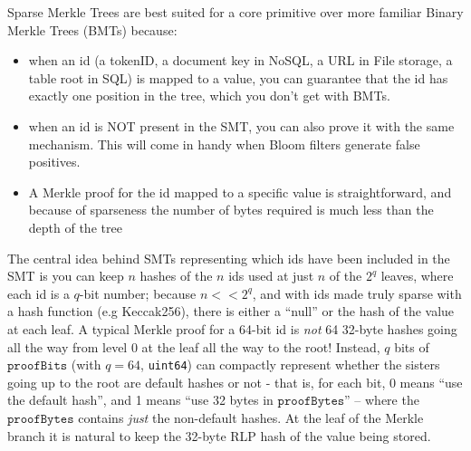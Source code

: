 \documentclass{article}
\newcommand{\proofBits}{\texttt{proofBits}}
\newcommand{\proofBytes}{\texttt{proofBytes}}
\begin{document}
Sparse Merkle Trees are best suited for a core primitive over more familiar Binary Merkle Trees (BMTs) because:
\begin{itemize}
\item when an id (a tokenID, a document key in NoSQL, a URL in File storage, a table root in SQL) is mapped to a value, you can guarantee that the id has exactly one position in the tree, which you don't get with BMTs.
\item when an id is NOT present in the SMT, you can also prove it with the same mechanism. This will come in handy when Bloom filters generate false positives.
\item   A Merkle proof for the id mapped to a specific value is straightforward, and because of sparseness the number of bytes required is much less than the depth of the tree
\end{itemize}
The central idea behind SMTs representing which ids have been included in the SMT is you can keep $n$ hashes of the $n$ ids used at just $n$ of the $2^q$ leaves, where each id is a $q$-bit number; because $n << 2^q$, and with ids made truly sparse with a hash function (e.g Keccak256), there is either a ``null'' or the hash of the value at each leaf.  A typical Merkle proof for a 64-bit id is {\em not} 64 32-byte hashes going all the way from level 0 at the leaf all the way to the root! Instead, $q$ bits of $\proofBits$ (with $q=64$, \texttt{uint64}) can compactly represent whether the sisters going up to the root are default hashes or not - that is, for each bit, $0$ means ``use the default hash'', and  1 means ``use 32 bytes in $\proofBytes$'' -- where the $\proofBytes$ contains {\em just} the non-default hashes. At the leaf of the Merkle branch it is natural to keep the 32-byte RLP hash of the value being stored.
\end{document}
